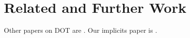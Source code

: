 \section{Related and Further Work}

Other papers on DOT are \cite{ARO14, AR17, AR16}. Our implicits paper is \cite{JB18}.

